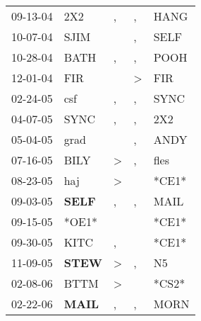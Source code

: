 \begin{supertabular}{p{0.07\textwidth}p{0.06\textwidth}p{0.02\textwidth}p{0.02\textwidth}p{0.06\textwidth}}
 09-13-04\textsuperscript{} &            2X2\textsuperscript{} &                , &                , &           HANG\textsuperscript{} \\
 10-07-04\textsuperscript{} &           SJIM\textsuperscript{} &                  &                , &           SELF\textsuperscript{} \\
 10-28-04\textsuperscript{} &           BATH\textsuperscript{} &                , &                , &           POOH\textsuperscript{} \\
 12-01-04\textsuperscript{} &            FIR\textsuperscript{} &                  &     \textgreater &            FIR\textsuperscript{} \\
 02-24-05\textsuperscript{} &            csf\textsuperscript{} &                , &                , &           SYNC\textsuperscript{} \\
 04-07-05\textsuperscript{} &           SYNC\textsuperscript{} &                , &                , &            2X2\textsuperscript{} \\
 05-04-05\textsuperscript{} &           grad\textsuperscript{} &                  &                , &           ANDY\textsuperscript{} \\
 07-16-05\textsuperscript{} &           BILY\textsuperscript{} &     \textgreater &                , &           fles\textsuperscript{} \\
 08-23-05\textsuperscript{} &            haj\textsuperscript{} &     \textgreater &                  &                            *CE1* \\
 09-03-05\textsuperscript{} &  \textbf{SELF\textsuperscript{}} &                , &                , &           MAIL\textsuperscript{} \\
 09-15-05\textsuperscript{} &                            *OE1* &                  &                  &                            *CE1* \\
 09-30-05\textsuperscript{} &           KITC\textsuperscript{} &                , &                  &                            *CE1* \\
 11-09-05\textsuperscript{} &  \textbf{STEW\textsuperscript{}} &     \textgreater &                , &             N5\textsuperscript{} \\
 02-08-06\textsuperscript{} &           BTTM\textsuperscript{} &     \textgreater &                  &                            *CS2* \\
 02-22-06\textsuperscript{} &  \textbf{MAIL\textsuperscript{}} &                , &                , &           MORN\textsuperscript{} \\

\end{supertabular}
